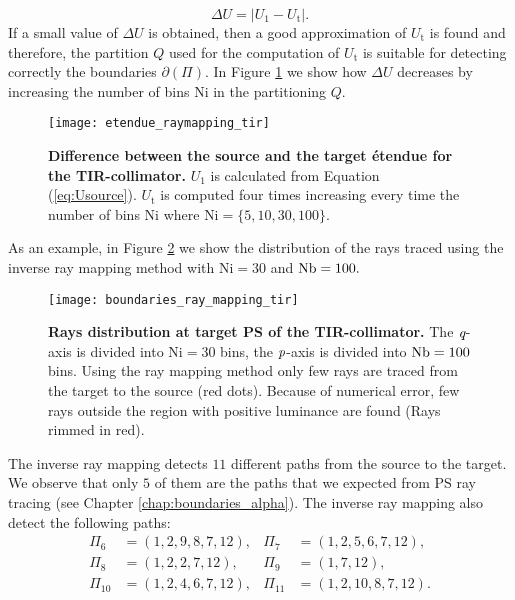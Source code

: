 \begin{equation}\label{eq:delta_raymapping}
\Delta U =  \big|U_1-U_{\textrm{t}}\big|.
\end{equation}
If a small value of $\Delta U$ is obtained, then a good approximation of $U_{\textrm{t}}$ is found and therefore, the partition $Q$ used for the computation of $U_{\textrm{t}}$ is suitable for detecting correctly the boundaries $\partial$$(\Pi)$. In Figure \ref{fig:etendue_raymapping_tir} we show how $\Delta U$ decreases by increasing the number of bins $\textrm{Ni}$ in the partitioning $Q$.  
\begin{figure}[h]
  \begin{center}
  \texttt{[image: etendue\_raymapping\_tir]}
  \end{center}
  \caption{\textbf{Difference between the source and the target \'{e}tendue for the TIR-collimator.}
 $U_1$ is calculated from Equation (\ref{eq:Usource}). $U_{\textrm{t}}$ is computed four times increasing every time the number of bins $\textrm{Ni}$ where $\textrm{Ni}=\{5,10,30,100\}$. }
\label{fig:etendue_raymapping_tir}
 \end{figure}
As an example, in Figure \ref{fig:boundaries_TIR_ray_mapping} we show the distribution of the rays traced using the inverse ray mapping method with $\textrm{Ni}=30$ and $\textrm{Nb} = 100.$ 
\begin{figure}[h]
  \begin{center}
  \texttt{[image: boundaries\_ray\_mapping\_tir]}
  \end{center}
  \caption{\textbf{Rays distribution at target PS of the TIR-collimator.}
 The $\textit{q}$-axis is divided into $\textrm{Ni}=30$ bins, the $\textit{p}$-axis is divided into $\textrm{Nb} = 100$ bins. Using the ray mapping method only few rays are traced from the target to the source (red dots). Because of numerical error, few rays outside the region with positive luminance are found (Rays rimmed in red).}
\label{fig:boundaries_TIR_ray_mapping}
 \end{figure}
The inverse ray mapping detects $11$ different paths from the source to the target. 
We observe that only $5$ of them are the paths that we expected from PS ray tracing (see Chapter \ref{chap:boundaries_alpha}). 
The inverse ray mapping also detect the following paths:
\begin{equation}
\begin{array}{llll}
\Pi_6&=(1,2,9,8,7,12), & \Pi_7&=(1,2,5,6,7,12), \\
\Pi_8&=(1,2,2,7,12),& \Pi_9&=(1,7,12),\\
\Pi_{10}&=(1,2,4,6,7,12),& \Pi_{11}&=(1,2,10,8,7,12).
\end{array}\end{equation}
